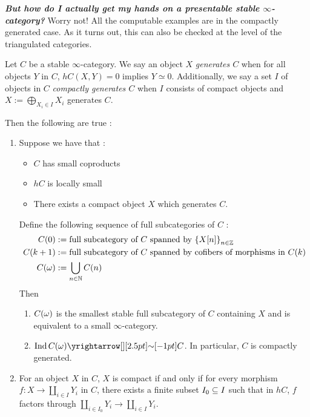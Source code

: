 \documentclass[./main.tex]{subfiles}
\begin{document}
\textbf{\emph{But how do I actually get my hands on a presentable
stable $\infty$-category?}}
Worry not! All the computable examples
are in the compactly generated case.
As it turns out, this can also be checked at the level of 
the triangulated categories.
\begin{prop}
  
  Let $C$ be a stable $\infty$-category.
  We say an object $X$ \emph{generates $C$} when
  for all objects $Y$ in $C$, 
  $hC (X,Y) = 0$ implies $Y \simeq 0$.
  Additionally, we say a set $I$ of objects in $C$ 
  \emph{compactly generates $C$} when $I$ consists of compact objects and
  $X := \bigoplus_{X_i \in I} X_i$ generates $C$.

  Then the following are true : 
  \begin{enumerate}
    \item Suppose we have that :
    \begin{itemize}
      \item $C$ has small coproducts
      \item $hC$ is locally small
      \item There exists a compact object $X$ which generates $C$.
    \end{itemize}
    Define the following sequence of full subcategories of $C$ : 
    \begin{align*}
      C(0) &:= 
        \text{full subcategory of $C$ spanned by $\left\{X[n]\right\}_{n \in\mathbb{Z}}$} \\
      C(k + 1) &:= 
        \text{full subcategory of $C$ spanned by 
        cofibers of morphisms in $C(k)$} \\
      C(\omega) &:= \bigcup_{n \in \mathbb{N}} C(n) 
    \end{align*}
    Then \begin{enumerate}
      \item $C(\omega)$ is the smallest stable full subcategory of $C$
      containing $X$ and is equivalent to a small $\infty$-category.
      \item $\IND\,C(\om) \map{\sim}{} C$.
      In particular, $C$ is compactly generated.
    \end{enumerate}
    \item \cite[Prop 1.4.4.1]{Lurie-HA} For an object $X$ in $C$,
    $X$ is compact if and only if for every morphism 
    $f : X \to \coprod_{i \in I} Y_i$ in $C$,
    there exists a finite subset $I_0 \subseteq I$ such that
    in $hC$, $f$ factors through 
    $\coprod_{i \in I_0} Y_i \to \coprod_{i \in I} Y_i$.


\end{enumerate}
\end{prop}
\end{document}

